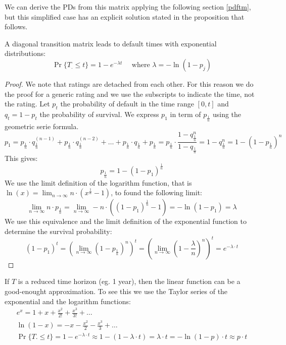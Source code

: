 \documentclass[11pt,fleqn]{book} %
\begin{document}
We can derive the PDs from this matrix applying the following 
section \ref{pdftm}, but this simplified case has an explicit
solution stated in the proposition that follows.

\begin{proposition}
A diagonal transition matrix leads to default times with exponential
distributions:
\begin{displaymath}
	\Pr\{T_. \le t\} = 1 - e^{-\lambda t} 
	\quad \text{ where } \lambda = -\ln(1-p_j)
\end{displaymath}
\end{proposition}
\begin{proof}
	We note that ratings are detached from each other. 
	For this reason we do the proof for a generic rating and we
	use the subscripts to indicate the time, not the rating.
	Let $p_t$ the probability of default in the time range $[0,t]$ and
	$q_t=1-p_t$ the probability of survival. We express $p_1$ in term
	of $p_{\frac{1}{n}}$ using the geometric serie formula.
	\begin{displaymath}
		p_1 = p_{\frac{1}{n}} \cdot q_{\frac{1}{n}}^{(n-1)} + 
			p_{\frac{1}{n}} \cdot q_{\frac{1}{n}}^{(n-2)} + \dots + 
			p_{\frac{1}{n}} \cdot q_{\frac{1}{n}} + 
			p_{\frac{1}{n}}
		= p_{\frac{1}{n}} \cdot \frac{1-q_{\frac{1}{n}}^n}{1-q_{\frac{1}{n}}}
		= 1 - q_{\frac{1}{n}}^n
		= 1- (1-p_{\frac{1}{n}})^n
	\end{displaymath}
	This gives:
	\begin{displaymath}
		p_{\frac{1}{n}} = 1-(1-p_1)^{\frac{1}{n}}
	\end{displaymath}
	We use the limit definition of the logarithm function, that is 
	$\ln(x)=\lim_{n \to \infty} n \cdot(x^{\frac{1}{n}}-1)$, to
	found the following limit:
	\begin{displaymath}
		\lim_{n \to \infty} n \cdot p_{\frac{1}{n}} = 
		\lim_{n \to \infty} -n \cdot ((1-p_1)^{\frac{1}{n}} -1) =
		-\ln(1-p_1) = \lambda
	\end{displaymath}
	We use this equivalence and the limit definition of the 
	exponential function to determine the survival probability:
	\begin{displaymath}
		(1-p_1)^t 
		= \left( \lim_{n \to \infty} (1-p_{\frac{1}{n}})^n \right)^t
		= \left(\lim_{n \to \infty} (1-\frac{\lambda}{n})^n \right)^t
		= e^{-\lambda \cdot t}
	\end{displaymath}
\end{proof}

If $T$ is a reduced time horizon (eg. 1 year), then the linear function
can be a good-enought approximation. To see this we use the Taylor series
of the exponential and the logarithm functions:
\begin{displaymath}
	\begin{array}{l}
		e^x = 1 +x + \frac{x^2}{2!} + \frac{x^3}{3!} + \dots
		\\
		\ln(1-x) = -x - \frac{x^2}{2} - \frac{x^3}{3} + \dots
		\\
		\Pr\{T. \le t\} = 1-e^{-\lambda\cdot t} \approx
		1 - (1-\lambda \cdot t) = \lambda \cdot t = 
		- \ln(1-p) \cdot t \approx p \cdot t
	\end{array}
\end{displaymath}
\end{document}
